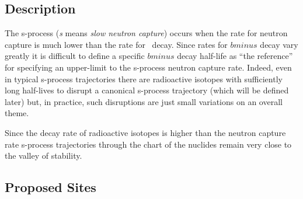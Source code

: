 \subsection{Description}
The s-process ({\it s} means {\it slow neutron capture}) occurs when
the rate for neutron capture is much lower than the rate
for \bminus\ decay.  Since rates for $bminus$ decay vary greatly
it is difficult to define a specific $bminus$ decay half-life as ``the
reference'' for specifying an upper-limit to the s-process neutron
capture rate.  Indeed, even in typical
s-process trajectories there are radioactive isotopes with
sufficiently long half-lives to disrupt a canonical s-process
trajectory (which will be defined later) but, in practice, such
disruptions are just small variations on an overall theme.  

Since the decay rate of radioactive isotopes is higher than the
neutron capture rate s-process trajectories through the chart of the
nuclides remain very close to the valley of stability.


\subsection{Proposed Sites}
